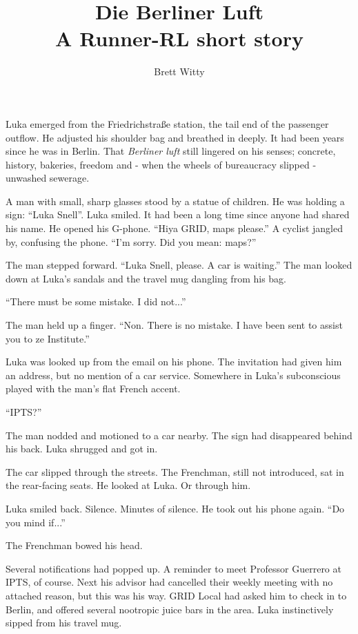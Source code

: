 \documentclass[ebook,11pt,oneside,openany]{memoir}
\title{Die Berliner Luft \\ A Runner-RL short story}
\author{Brett Witty}
\newcommand{\scenechange}{
  \par
  \vspace{\baselineskip}
  \par
\noindent}
\begin{document}
\maketitle

Luka emerged from the Friedrichstraße station, the tail end of the passenger outflow. He adjusted his shoulder bag and breathed in deeply. It had been years since he was in Berlin. That \textit{Berliner luft} still lingered on his senses; concrete, history, bakeries, freedom and - when the wheels of bureaucracy slipped - unwashed sewerage.

A man with small, sharp glasses stood by a statue of children. He was holding a sign: ``Luka Snell''. Luka smiled. It had been a long time since anyone had shared his name. He opened his G-phone. ``Hiya GRID, maps please.'' A cyclist jangled by, confusing the phone. ``I'm sorry. Did you mean: maps?''

The man stepped forward. ``Luka Snell, please. A car is waiting.'' The man looked down at Luka's sandals and the travel mug dangling from his bag.

``There must be some mistake. I did not...''

The man held up a finger. ``Non. There is no mistake. I have been sent to assist you to ze Institute.''

Luka was looked up from the email on his phone. The invitation had given him an address, but no mention of a car service. Somewhere in Luka's subconscious played with the man's flat French accent.

``IPTS?''

The man nodded and motioned to a car nearby. The sign had disappeared behind his back. Luka shrugged and got in.

\scenechange

The car slipped through the streets. The Frenchman, still not introduced, sat in the rear-facing seats. He looked at Luka. Or through him.

Luka smiled back. Silence. Minutes of silence. He took out his phone again. ``Do you mind if...''

The Frenchman bowed his head.

Several notifications had popped up. A reminder to meet Professor Guerrero at IPTS, of course. Next his advisor had cancelled their weekly meeting with no attached reason, but this was his way. GRID Local had asked him to check in to Berlin, and offered several nootropic juice bars in the area. Luka instinctively sipped from his travel mug.
\end{document}
